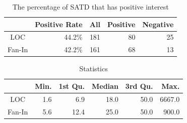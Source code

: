 \begin{table}[tb]
  \caption{The percentage of SATD that has positive interest}
  \label{tab:percentage}
  \centering

  \begin{tabular}{c|r|rrr}
  \hline
        & Positive Rate & All & Positive & Negative \\
  \hline
   LOC  & 44.2\% & 181 &  80  &  25 \\
Fan-In  & 42.2\% & 161 &  68  &  13 \\
  \hline
  \end{tabular}
\end{table}

\begin{table}[tb]
  \caption{Statistics}
  \label{tab:statistic}
  \centering

  \begin{tabular}{c|rrrrr}
  \hline
        & Min. & 1st Qu. & Median & 3rd Qu. & Max. \\
  \hline
   LOC  & 1.6 &   6.9 &  18.0  &   50.0 & 6667.0 \\
Fan-In  & 5.6 &  12.4 &  25.0  &   50.0 &  900.0 \\
  \hline
  \end{tabular}
\end{table}





